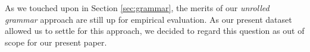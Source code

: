 \documentclass{article} %
\begin{document}


    As we touched upon in Section \ref{sec:grammar},
    the merits of our \emph{unrolled grammar} approach are still up for empirical evaluation.
    As our present dataset allowed us to settle for this approach,
    we decided to regard this question as out of scope for our present paper.


\end{document}
